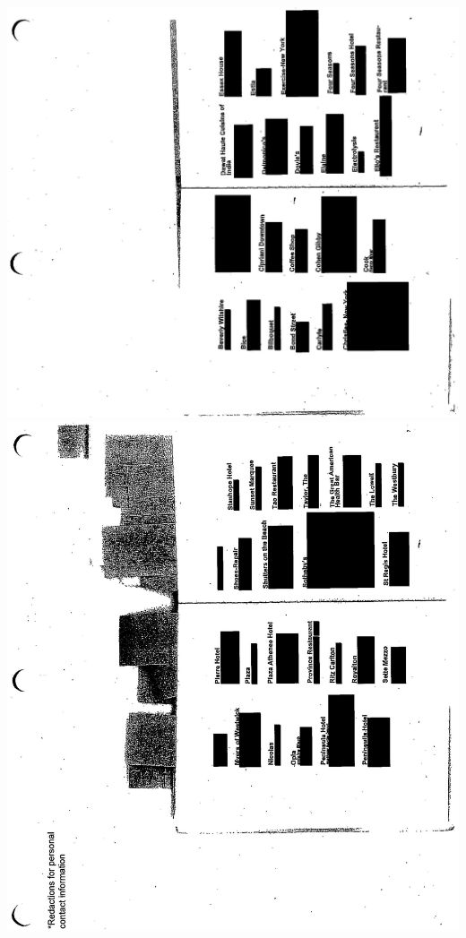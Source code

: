 \documentclass[10pt]{article}
\begin{document}
\includegraphics[max width=\textwidth, center]{2025_02_27_dd68c3d38de88f0516d9g-183}\\
\includegraphics[max width=\textwidth, center]{2025_02_27_dd68c3d38de88f0516d9g-184}\\
\end{document}
